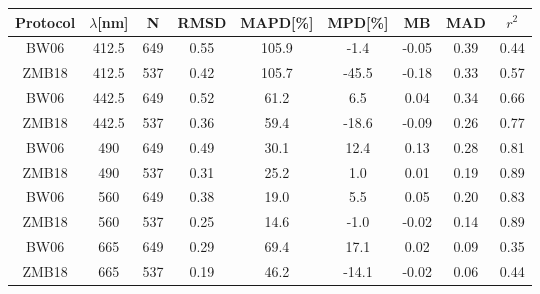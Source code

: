 \documentclass[preview]{standalone}
\begin{document}
\small

\begin{table}
\begin{tabular}{ccccccccc}

\hline
Protocol & $\lambda$[nm] & N & RMSD & MAPD[\%] & MPD[\%] & MB & MAD & $r^2$  \\\hline
 
BW06 & 412.5 & 649 & 0.55 & 105.9 & -1.4 & -0.05 & 0.39 & 0.44\\
ZMB18 & 412.5 & 537 & 0.42 & 105.7 & -45.5 & -0.18 & 0.33 & 0.57\\\hline

BW06 & 442.5 & 649 & 0.52 & 61.2 & 6.5 & 0.04 & 0.34 & 0.66\\
ZMB18 & 442.5 & 537 & 0.36 & 59.4 & -18.6 & -0.09 & 0.26 & 0.77\\\hline

BW06 & 490 & 649 & 0.49 & 30.1 & 12.4 & 0.13 & 0.28 & 0.81\\
ZMB18 & 490 & 537 & 0.31 & 25.2 & 1.0 & 0.01 & 0.19 & 0.89\\\hline

BW06 & 560 & 649 & 0.38 & 19.0 & 5.5 & 0.05 & 0.20 & 0.83\\
ZMB18 & 560 & 537 & 0.25 & 14.6 & -1.0 & -0.02 & 0.14 & 0.89\\\hline

BW06 & 665 & 649 & 0.29 & 69.4 & 17.1 & 0.02 & 0.09 & 0.35\\
ZMB18 & 665 & 537 & 0.19 & 46.2 & -14.1 & -0.02 & 0.06 & 0.44\\\hline


\end{tabular}
\end{table}
\end{document}
